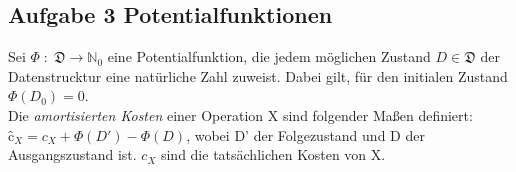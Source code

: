 \documentclass[11pt,a4paper,ngerman]{article}
\begin{document}
\subsection*{Aufgabe 3 \mdseries Potentialfunktionen}

Sei $\Phi \; : \; \mathfrak{D} \rightarrow \mathbb{N}_0$ eine Potentialfunktion, die jedem möglichen Zustand $D \in \mathfrak{D}$ der Datenstrucktur eine natürliche Zahl zuweist. Dabei gilt, für den initialen Zustand $\Phi(D_0) = 0$.\\

Die \emph{amortisierten Kosten} einer Operation X sind folgender Maßen definiert:\\
$\text{\^{c}}_X = c_X + \Phi(D') - \Phi(D)$, wobei D' der Folgezustand und D der Ausgangszustand ist. $c_X$ sind die tatsächlichen Kosten von X.
\end{document}
